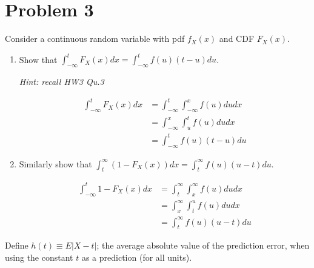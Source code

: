 \documentclass{article}
\newcommand{\1}{\mathbf{1}}
\begin{document}
\newpage
\section*{Problem 3}
Consider a continuous random variable with pdf $f_X(x)$ and CDF $F_X(x)$.
\begin{enumerate}
    \item Show that $\int_{-\infty}^t F_X(x) dx = \int_{-\infty}^t f(u) (t-u) du$.\par {\it Hint: recall HW3 Qu.3}
    
    \begin{align*}
        \int_{-\infty}^t F_X(x) dx &= \int_{-\infty}^t\int_{-\infty}^x f(u)dudx \\
        &= \int_{-\infty}^x\int_{u}^t f(u)dudx \\
        &= \int_{-\infty}^t f(u)(t-u) du
    \end{align*}

    \item Similarly show that $\int_{t}^\infty (1-F_X(x)) dx = \int_{t}^\infty f(u) (u-t) du$.
    
    \begin{align*}
        \int_{-\infty}^t 1-F_X(x) dx &= \int_t^\infty\int_x^\infty f(u)dudx \\
        &= \int_x^\infty \int_t^u f(u)dudx \\
        &= \int_t^\infty f(u)(u-t) du
    \end{align*}
\end{enumerate}
Define $h(t) \equiv E|X-t|$; the average absolute value of the prediction error, when using the constant $t$ as a prediction (for all units).
\end{document}
